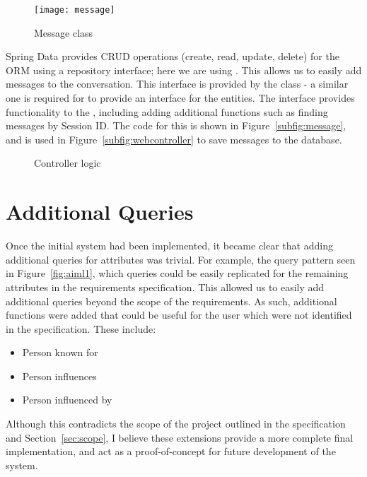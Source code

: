 \begin{figure}[h]
	\centering
	\texttt{[image: message]}
	\caption{Message class}
	\label{fig:message}
\end{figure}


Spring Data provides CRUD operations (create, read, update, delete) for the ORM using a repository interface; here we are using . This allows us to easily add messages to the conversation. This interface is provided by the  class - a similar one is required for  to provide an interface for the  entities. The  interface provides functionality to the , including adding additional functions such as finding messages by Session ID. The code for this is shown in Figure~\ref{subfig:message}, and is used in Figure~\ref{subfig:webcontroller} to save messages to the database.

\begin{figure}[h]
	\centering
	\qquad
	\caption{Controller logic}
	\label{fig:controller}
\end{figure}

\section{Additional Queries}
Once the initial system had been implemented, it became clear that adding additional queries for attributes was trivial. For example, the query pattern seen in Figure~\ref{fig:aiml1}, which queries  could be easily replicated for the remaining attributes in the requirements specification. This allowed us to easily add additional queries beyond the scope of the requirements. As such, additional functions were added that could be useful for the user which were not identified in the specification. These include:
\begin{itemize}
	\item Person known for
	\item Person influences
	\item Person influenced by
\end{itemize}
Although this contradicts the scope of the project outlined in the specification and Section~\ref{sec:scope}, I believe these extensions provide a more complete final implementation, and act as a proof-of-concept for future development of the system.


